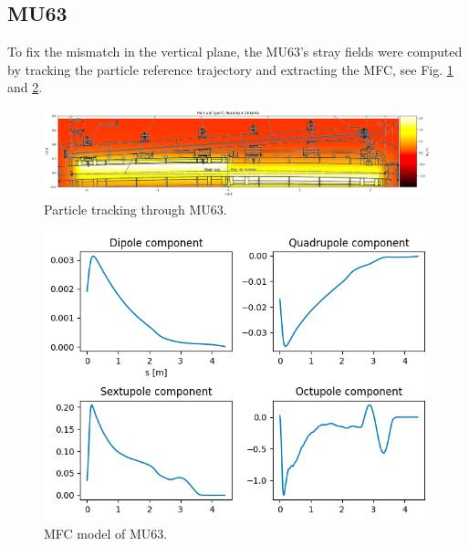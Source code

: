 \subsection{MU63}

To fix the mismatch in the vertical plane, the MU63's stray fields were computed by tracking the particle reference trajectory and extracting the MFC, see Fig. \ref{fig:track_mu63} and \ref{fig:mfc_mu63}.

\begin{figure}[H]
\centering
\includegraphics[width=1.0\textwidth]{02_Simulation/images/track_mu63.png}
\caption{Particle tracking through MU63.}
\label{fig:track_mu63}
\end{figure}

\begin{figure}[H]
\centering
\includegraphics[width=1.0\textwidth]{02_Simulation/images/mfc_mu63.png}
\caption{MFC model of MU63.}
\label{fig:mfc_mu63}
\end{figure}

